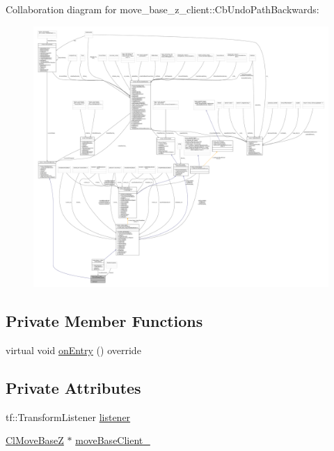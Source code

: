 Collaboration diagram for move\+\_\+base\+\_\+z\+\_\+client\+:\+:Cb\+Undo\+Path\+Backwards\+:
\nopagebreak
\begin{figure}[H]
\begin{center}
\leavevmode
\includegraphics[width=350pt]{classmove__base__z__client_1_1CbUndoPathBackwards__coll__graph}
\end{center}
\end{figure}
\subsection*{Private Member Functions}
\begin{DoxyCompactItemize}
\item 
virtual void \hyperlink{classmove__base__z__client_1_1CbUndoPathBackwards_a2793c69857aa97337d56ff79dee20508}{on\+Entry} () override
\end{DoxyCompactItemize}
\subsection*{Private Attributes}
\begin{DoxyCompactItemize}
\item 
tf\+::\+Transform\+Listener \hyperlink{classmove__base__z__client_1_1CbUndoPathBackwards_a197e2034e873c09de896e7a8b6fe898f}{listener}
\item 
\hyperlink{classmove__base__z__client_1_1ClMoveBaseZ}{Cl\+Move\+BaseZ} $\ast$ \hyperlink{classmove__base__z__client_1_1CbUndoPathBackwards_a19e7ace85698725a1d2730a7c6b3aa7d}{move\+Base\+Client\+\_\+}
\end{DoxyCompactItemize}
